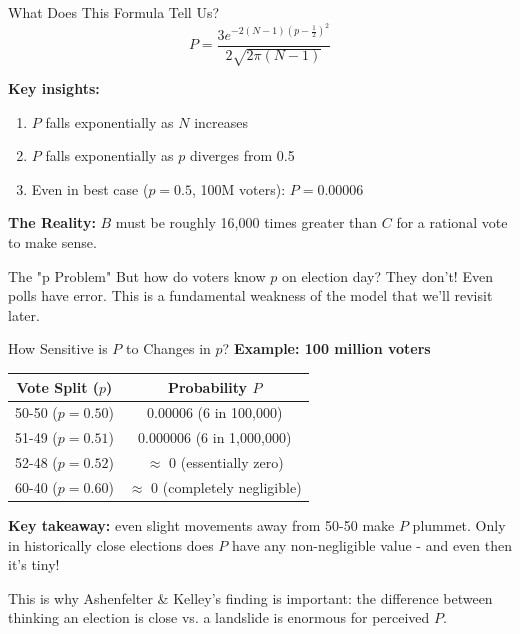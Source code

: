 \documentclass[10pt]{beamer}
\begin{document}
\begin{frame}{What Does This Formula Tell Us?}
$$P = \frac{3e^{-2(N-1)(p-\frac{1}{2})^2}}{2\sqrt{2\pi(N-1)}}$$

\textbf{Key insights:}
\begin{enumerate}
\item $P$ falls \alert{exponentially} as $N$ increases
\item $P$ falls \alert{exponentially} as $p$ diverges from 0.5
\item Even in best case ($p = 0.5$, 100M voters): $P = 0.00006$
\end{enumerate}

\textbf{The Reality:} $B$ must be roughly 16,000 times greater than $C$ for a rational vote to make sense.

\begin{alertblock}{The "p Problem"}
But how do voters know $p$ on election day? They don't! Even polls have error. This is a fundamental weakness of the model that we'll revisit later.
\end{alertblock}
\end{frame}

\begin{frame}{How Sensitive is $P$ to Changes in $p$?}
\textbf{Example: 100 million voters}

\begin{table}
\centering
\begin{tabular}{cc}
\toprule
\textbf{Vote Split ($p$)} & \textbf{Probability $P$} \\
\midrule
50-50 ($p = 0.50$) & 0.00006 (6 in 100,000) \\
51-49 ($p = 0.51$) & 0.000006 (6 in 1,000,000) \\
52-48 ($p = 0.52$) & $\approx$ 0 (essentially zero) \\
60-40 ($p = 0.60$) & $\approx$ 0 (completely negligible) \\
\bottomrule
\end{tabular}
\end{table}

\textbf{Key takeaway:} even slight movements away from 50-50 make $P$ plummet. Only in \alert{historically close} elections does $P$ have any non-negligible value - and even then it's tiny!

\footnotesize{This is why Ashenfelter \& Kelley's finding is important: the difference between thinking an election is close vs. a landslide is enormous for perceived $P$.}
\end{frame}
\end{document}
